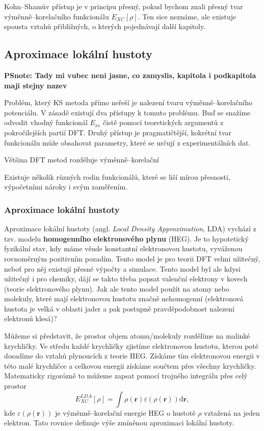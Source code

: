 Kohn--Shamův přístup je v principu přesný, pokud bychom znali přesný tvar výměnně--korelačního funkcionálu $E_{XC}[\rho]$.
Ten sice neznáme, ale existuje spousta vztahů přibližných, o kterých pojednávají další kapitoly.


\subsection{Aproximace lokální hustoty}
\textbf{PSnote: Tady mi vubec neni jasne, co zamyslis, kapitola i podkapitola maji stejny nazev}

Problém, který KS metoda přímo neřeší je nalezení tvaru výměnně--korelačního potenciálu.
V zásadě existují dva přístupy k tomuto problému. Buď se snažíme odvodit vhodný funkcionál $E_{xc}$ čistě pomocí teoretických argumentů z pokročilejších partií DFT. Druhý přístup je pragmatičtější, kokrétní tvar funkcionálu může obsahovat parametry, které se určují z experimentálních dat.

Většina DFT metod rozděluje výměnně--korelační 

Existuje několik různých rodin funkcionálů, které se liší mírou přesnosti, výpočetními nároky i svým zaměřením.

\subsubsection{Aproximace lokální hustoty}
Aproximace lokální hustoty (angl. \textit{Local Density Approximation}, LDA) vychází z tzv. modelu \textbf{homogenního elektronového plynu} (HEG). Je to hypotetický fyzikální stav, kdy máme všude konstantní elektronovou hustotu, vyváženou rovnoměrným pozitivním pozadím. Tento model je pro teorii DFT velmi užitečný, neboť pro něj existují přesné výpočty a simulace. Tento model byl ale kdysi užitečný i pro chemiky, dájí se takto třeba popsat valenční elektrony v kovech (teorie elektronového plynu). Jak ale tento model použít na atomy nebo molekuly, které mají elektronovou hustotu značně nehomogenní (elektronová hustota je velká v oblasti jader a pak postupně pravděpodobnost nalezení elektronů klesá)?

Můžeme si představit, že prostor objem atomu/molekuly rozdělíme na malinké krychličky. Ve středu každé krychličky zjistíme elektronovou hustotu, kterou poté dosadíme do vztahů plynoucích z teorie HEG.
Získáme tím elektronovou energii v této malé krychličce a celkovou energii získáme součtem přes všechny krychličky. Matematicky rigorózně to můžeme zapsat pomocí trojného integrálu přes celý prostor
\begin{equation}
E_{XC}^{LDA}[\rho]=\int \rho(\textbf{r}) \varepsilon(\rho(\textbf{r})) \mathrm{d}\textbf{r} ,
\end{equation}
kde $\varepsilon(\rho(\textbf{r}))$ je výměnně--korelační energie HEG o hustotě $\rho$ vztažená na jeden elektron. Tato rovnice definuje výše zmíněnou aproximaci lokální hustoty.

